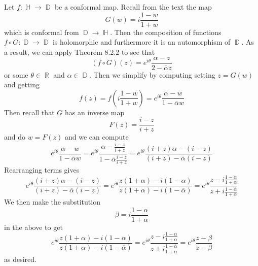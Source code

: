 \documentclass{article}
\DeclareMathOperator{\R}{\mathbb{R}}
\DeclareMathOperator{\Ha}{\mathbb{H}}
\DeclareMathOperator{\D}{\mathbb{D}}
\newcommand{\conj}[1]{\overline{#1}}
\begin{document}
Let $f: \Ha \to \D$ be a conformal map. Recall from the text the map
\[
G(w) = i\frac{1-w}{1+w}
\]
which is conformal from $\D\to\Ha$. Then the composition of functions
$f \circ G: \D \to \D$ is holomorphic and furthermore it is an
automorphism of $\D$. As a result, we can apply Theorem 8.2.2 to see that
\[
(f \circ G)(z) = e^{i\theta}\frac{\alpha - z}{2-\conj{\alpha}z}
\]
or some $\theta \in \R$ and $\alpha\in \D$. Then we simplify by
computing setting $z = G(w)$ and getting
\[
f(z) = f\left(i\frac{1-w}{1+w}\right)=e^{i\theta}\frac{\alpha -
  w}{1-\conj{\alpha}w}
\]
Then recall that $G$ has an inverse map
\[
F(z) = \frac{i-z}{i+z}
\]
and do $w = F(z)$ and we can compute
\[
e^{i\theta}\frac{\alpha - w}{1-\conj{\alpha}w} =
e^{i\theta}\frac{\alpha -
  \frac{i-z}{i+z}}{1-\conj{\alpha}\frac{i-z}{i+z}} =
e^{i\theta}\frac{(i+z)\alpha - (i-z)}{(i+z)-\conj{\alpha}(i-z)}
\]
Rearranging terms gives
\[
e^{i\theta}\frac{(i+z)\alpha - (i-z)}{(i+z)-\conj{\alpha}(i-z)} =
e^{i\theta}\frac{z(1+\alpha) -
  i(1-\alpha)}{z(1+\alpha)-i(1-\conj{\alpha})} = e^{i\theta}\frac{z -
  i\frac{1-\alpha}{1+\alpha}}{z + i\frac{1-\conj{\alpha}}{1+\alpha}}
\]
We then make the substitution
\[
\beta = i\frac{1-\alpha}{1+\alpha}
\]
in the above to get
\[
e^{i\theta}\frac{z(1+\alpha) -
  i(1-\alpha)}{z(1+\alpha)-i(1-\conj{\alpha})} = e^{i\theta}\frac{z -
  i\frac{1-\alpha}{1+\alpha}}{z + i\frac{1-\conj{\alpha}}{1+\alpha}} =
e^{i\theta}\frac{z-\beta}{z-\beta}
\]
as desired.
\end{document}
